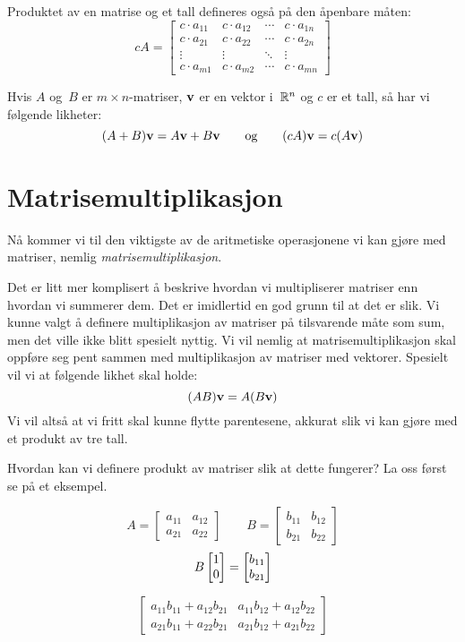 Produktet av en matrise og et tall defineres også på den åpenbare
måten:
\[
c A =
\begin{bmatrix}
c \cdot a_{11} & c \cdot a_{12} & \cdots & c \cdot a_{1n} \\
c \cdot a_{21} & c \cdot a_{22} & \cdots & c \cdot a_{2n} \\
\vdots         & \vdots         & \ddots & \vdots         \\
c \cdot a_{m1} & c \cdot a_{m2} & \cdots & c \cdot a_{mn}
\end{bmatrix}
\]


\begin{thm}
Hvis $A$ og~$B$ er $m \times n$-matriser, $\mathbf{v}$ er en vektor
i~$\mathbb{R}^n$ og $c$ er et tall, så har vi følgende likheter:
\[
(A + B) \mathbf{v} = A \mathbf{v} + B \mathbf{v}
\qquad\text{og}\qquad
(c A) \mathbf{v} = c (A \mathbf{v})
\]
\end{thm}


\section*{Matrisemultiplikasjon}

Nå kommer vi til den viktigste av de aritmetiske operasjonene vi kan
gjøre med matriser, nemlig \emph{matrisemultiplikasjon}.

Det er litt mer komplisert å beskrive hvordan vi multipliserer
matriser enn hvordan vi summerer dem.  Det er imidlertid en god grunn
til at det er slik.  Vi kunne valgt å definere multiplikasjon av
matriser på tilsvarende måte som sum, men det ville ikke blitt
spesielt nyttig.  Vi vil nemlig at matrisemultiplikasjon skal oppføre
seg pent sammen med multiplikasjon av matriser med vektorer.  Spesielt
vil vi at følgende likhet skal holde:
\[
(AB) \mathbf{v} = A (B \mathbf{v})
\]
Vi vil altså at vi fritt skal kunne flytte parentesene, akkurat slik
vi kan gjøre med et produkt av tre tall.

Hvordan kan vi definere produkt av matriser slik at dette fungerer?
La oss først se på et eksempel.

\begin{ex}
\end{ex}

\begin{ex}
\[
A =
\begin{bmatrix}
a_{11} & a_{12} \\
a_{21} & a_{22}
\end{bmatrix}
\qquad
B =
\begin{bmatrix}
b_{11} & b_{12} \\
b_{21} & b_{22}
\end{bmatrix}
\]
\[
B \begin{bmatrix} 1 \\ 0 \end{bmatrix} = \begin{bmatrix} b_{11} \\ b_{21} \end{bmatrix}
\]


\[
\begin{bmatrix}
a_{11} b_{11} + a_{12} b_{21} & a_{11} b_{12} + a_{12} b_{22} \\
a_{21} b_{11} + a_{22} b_{21} & a_{21} b_{12} + a_{21} b_{22}
\end{bmatrix}
\]
\end{ex}


